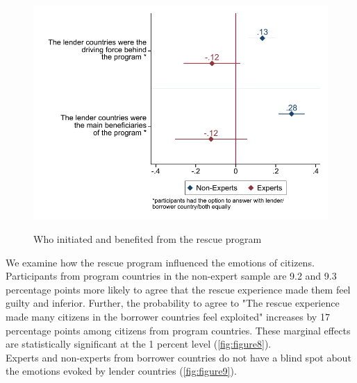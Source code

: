 \begin{figure}[h!] 
\begin{center}
     \caption{Who initiated and benefited from the rescue program}
     \includegraphics[scale=0.8]{Question3_4_base.pdf}
     \label{fig:figure7}
     \end{center}
     \tiny
\end{figure}
We examine how the rescue program influenced the emotions of citizens. Participants from program countries in the non-expert sample are 9.2 and 9.3 percentage points more likely to agree that the rescue experience made them feel guilty and inferior. Further, the probability to agree to "The rescue experience made many citizens in the borrower countries feel exploited" increases by 17 percentage points among citizens from program countries. These marginal effects are statistically significant at the 1 percent level (\autoref{fig:figure8}).  \\
Experts and non-experts from borrower countries do not have a blind spot about the emotions evoked by lender countries (\autoref{fig:figure9}).  \\


